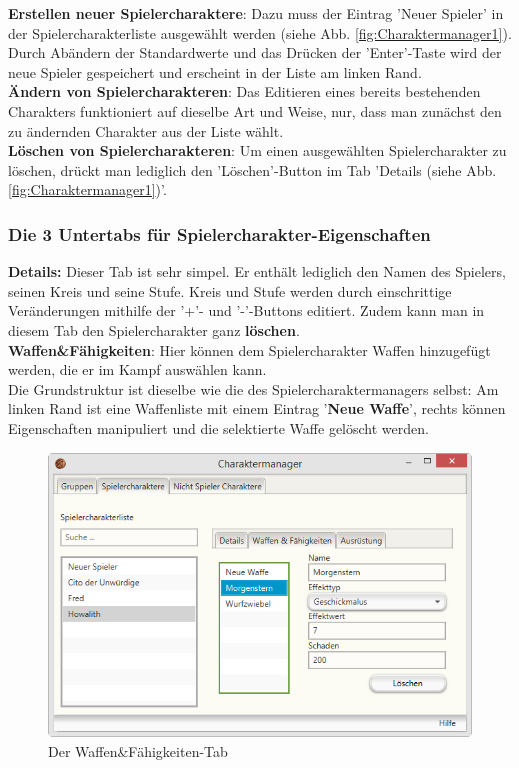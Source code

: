 \documentclass[11pt, a4paper, german]{article}
\begin{document}
\textbf{Erstellen neuer Spielercharaktere}: Dazu muss der Eintrag 'Neuer Spieler' in der Spielercharakterliste ausgewählt werden (siehe Abb. \ref{fig:Charaktermanager1}). Durch Abändern der Standardwerte und das Drücken der 'Enter'-Taste wird der neue Spieler gespeichert und erscheint in der Liste am linken Rand.\\

\textbf{Ändern von Spielercharakteren}: Das Editieren eines bereits bestehenden Charakters funktioniert auf dieselbe Art und Weise, nur, dass man zunächst den zu ändernden Charakter aus der Liste wählt.\\

\textbf{Löschen von Spielercharakteren}: Um einen ausgewählten Spielercharakter zu löschen, drückt man lediglich den 'Löschen'-Button im Tab 'Details (siehe Abb. \ref{fig:Charaktermanager1})'.


\subsubsection{Die 3 Untertabs für Spielercharakter-Eigenschaften}
\textbf{Details:} Dieser Tab ist sehr simpel. Er enthält lediglich den Namen des Spielers, seinen Kreis und seine Stufe. Kreis und Stufe werden durch einschrittige Veränderungen mithilfe der '+'- und '-'-Buttons editiert. Zudem kann man in diesem Tab den Spielercharakter ganz \textbf{löschen}.\\

\textbf{Waffen\&Fähigkeiten}: Hier können dem Spielercharakter Waffen hinzugefügt werden, die er im Kampf auswählen kann. \\
Die Grundstruktur ist dieselbe wie die des Spielercharaktermanagers selbst: Am linken Rand ist eine Waffenliste mit einem Eintrag '\textbf{Neue Waffe}', rechts können Eigenschaften manipuliert und die selektierte Waffe gelöscht werden.
\begin{figure}[h]
\centering
\includegraphics[width=1\linewidth]{Bilder/Charaktermanager_Spieler1}
\caption{Der Waffen\&Fähigkeiten-Tab}
\label{fig:Charaktermanager_Spieler1}
\end{figure}
\end{document}
